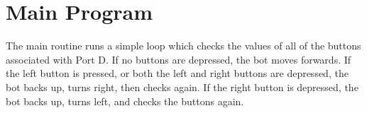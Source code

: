 \documentclass[12pt,letterpaper]{article}
\begin{document}
\section{Main Program}
The main routine runs a simple loop which checks the values of all of the buttons associated with Port D. If no buttons are depressed, the bot moves forwards. If the left button is pressed, or both the left and right buttons are depressed, the bot backs up, turns right, then checks again. If the right button is depressed, the bot backs up, turns left, and checks the buttons again.


\end{document}
